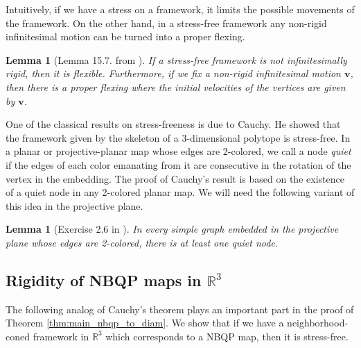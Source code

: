 \documentclass{article}
\newtheorem{lemma}[theorem]{Lemma}
\newcommand{\vv}[0]{\mathbf{v}}
\newcommand{\R}[0]{\mathbb{R}}
\begin{document}
 


Intuitively, if we have a stress on a framework, it limits the possible movements of the framework. On the other hand, in a stress-free framework any non-rigid infinitesimal motion can be turned into a proper flexing. 

    \begin{lemma}[Lemma 15.7. from \cite{lovasz2019graphs}]\label{lem:flexing}
        If a stress-free framework is not infinitesimally rigid, then it is flexible. Furthermore, if we fix a non-rigid infinitesimal motion $\vv$, then there is a proper flexing where the initial velocities of the vertices are given by $\vv$.
    \end{lemma}







One of the classical results on stress-freeness is due to Cauchy. He showed that the framework given by the skeleton of a 3-dimensional polytope is stress-free. In a planar or projective-planar map whose edges are 2-colored, we call a node \emph{quiet} if the edges of each color emanating from it are consecutive in the rotation of the vertex in the embedding. The proof of Cauchy's result is based on the existence of a quiet node in any 2-colored planar map. We will need the following variant of this idea in the projective plane. 

\begin{lemma}[Exercise 2.6 in \cite{lovasz2019graphs}]\label{lemma:quiet}
    In every simple graph embedded in the projective plane whose edges are 2-colored, there is at least one quiet node.
\end{lemma}

\subsection{Rigidity of NBQP maps in $\R^3$}



The following analog of Cauchy's theorem plays an important part in the proof of Theorem \ref{thm:main_nbqp_to_diam}.  We show that if we have a neighborhood-coned framework in $\R^3$ which corresponds to a NBQP map, then it is stress-free. 
\end{document}
